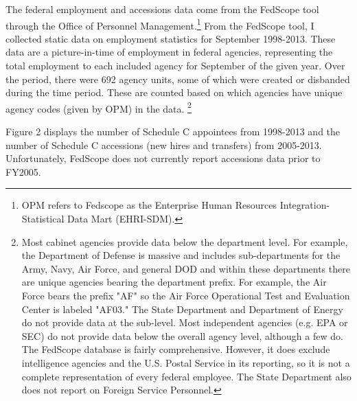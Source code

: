 \documentclass[12pt]{article}
\begin{document}
The federal employment and accessions data come from the FedScope tool through the Office of Personnel Management.\footnote{OPM refers to Fedscope as the Enterprise Human Resources Integration-Statistical Data Mart (EHRI-SDM).} From the FedScope tool, I collected static data on employment statistics for September 1998-2013. These data are a picture-in-time of employment in federal agencies, representing the total employment to each included agency for September of the given year. Over the period, there were 692 agency units, some of which were created or disbanded during the time period. These are counted based on which agencies have unique agency codes (given by OPM) in the data. \footnote{Most cabinet agencies provide data below the department level. For example, the Department of Defense is massive and includes sub-departments for the Army, Navy, Air Force, and general DOD and within these departments there are unique agencies bearing the department prefix. For example, the Air Force bears the prefix "AF" so the Air Force Operational Test and Evaluation Center is labeled "AF03." The State Department and Department of Energy do not provide data at the sub-level. Most independent agencies (e.g. EPA or SEC) do not provide data below the overall agency level, although a few do. The FedScope database is fairly comprehensive. However, it does exclude intelligence agencies and the U.S. Postal Service in its reporting, so it is not a complete representation of every federal employee. The State Department also does not report on Foreign Service Personnel.}

Figure 2 displays the number of Schedule C appointees from 1998-2013 and the number of Schedule C accessions (new hires and transfers) from 2005-2013. Unfortunately, FedScope does not currently report accessions data prior to FY2005. 
\end{document}
